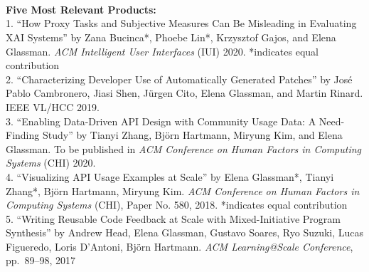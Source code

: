\documentclass[11pt]{article}
\begin{document}
\\
\\




      
\\
{\bf Five Most Relevant Products:}\\
1. ``How Proxy Tasks and Subjective Measures Can Be Misleading in Evaluating XAI Systems'' by Zana Bucinca*, Phoebe Lin*, Krzysztof Gajos, and Elena Glassman. {\em ACM Intelligent User Interfaces} (IUI) 2020. *indicates equal contribution\\[2pt]
2. ``Characterizing Developer Use of Automatically Generated Patches'' by Jos\'e Pablo Cambronero, Jiasi Shen, J\"urgen Cito, Elena Glassman, and Martin Rinard. IEEE VL/HCC 2019.\\[2pt]
3. ``Enabling Data-Driven API Design with Community Usage Data: A Need-Finding Study'' by Tianyi Zhang, Björn Hartmann, Miryung Kim, and Elena Glassman. To be published in \emph{ACM Conference on Human Factors in Computing Systems} (CHI) 2020.\\[2pt]
4. ``Visualizing API Usage Examples at Scale'' by Elena Glassman*, Tianyi Zhang*, Bj\"orn Hartmann, Miryung Kim. \emph{ACM Conference on Human Factors in Computing Systems} (CHI), Paper No. 580, 2018. *indicates equal contribution\\[2pt]
5. ``Writing Reusable Code Feedback at Scale with Mixed-Initiative Program Synthesis'' by Andrew Head, Elena Glassman, Gustavo Soares, Ryo Suzuki, Lucas Figueredo, Loris D'Antoni, Bj\"orn Hartmann. {\em ACM Learning@Scale Conference}, pp.~89--98, 2017\\[2pt]
\end{document}
